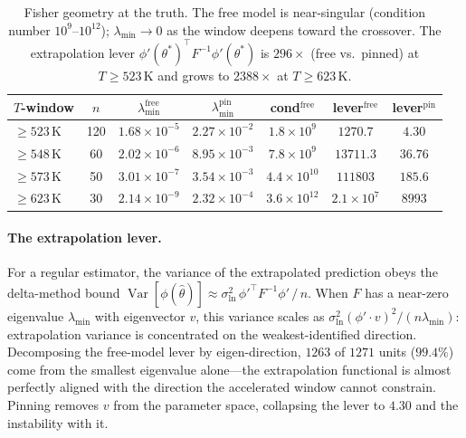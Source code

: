 \documentclass{article}
\newcommand{\sln}{\sigma_{\ln}}
\begin{document}
\begin{table}[t]
\centering\small
\begin{tabular}{lcccccc}
\toprule
$T$-window & $n$ & $\lambda_{\min}^{\mathrm{free}}$ &
$\lambda_{\min}^{\mathrm{pin}}$ & cond$^{\mathrm{free}}$ &
lever$^{\mathrm{free}}$ & lever$^{\mathrm{pin}}$ \\
\midrule
$\ge523$\,K & 120 & $1.68\times10^{-5}$ & $2.27\times10^{-2}$ &
$1.8\times10^9$ & $1270.7$ & $4.30$ \\
$\ge548$\,K & 60 & $2.02\times10^{-6}$ & $8.95\times10^{-3}$ &
$7.8\times10^9$ & $13711.3$ & $36.76$ \\
$\ge573$\,K & 50 & $3.01\times10^{-7}$ & $3.54\times10^{-3}$ &
$4.4\times10^{10}$ & $111803$ & $185.6$ \\
$\ge623$\,K & 30 & $2.14\times10^{-9}$ & $2.32\times10^{-4}$ &
$3.6\times10^{12}$ & $2.1\times10^7$ & $8993$ \\
\bottomrule
\end{tabular}
\caption{Fisher geometry at the truth. The free model is near-singular
(condition number $10^9$--$10^{12}$); $\lambda_{\min}\to0$ as the window
deepens toward the crossover. The extrapolation lever
$\phi'(\theta^*)^{\top}F^{-1}\phi'(\theta^*)$ is $296\times$ (free vs.\ pinned)
at $T\ge523$\,K and grows to $2388\times$ at $T\ge623$\,K.}
\label{tab:fisher}
\end{table}

\paragraph{The extrapolation lever.} For a regular estimator, the variance of
the extrapolated prediction obeys the delta-method bound
$\operatorname{Var}[\phi(\hat\theta)]\approx
\sln^2\,\phi'^{\top}F^{-1}\phi'\,/\,n$. When $F$ has a near-zero eigenvalue
$\lambda_{\min}$ with eigenvector $v$, this variance scales as
$\sln^2(\phi'\cdot v)^2/(n\lambda_{\min})$: extrapolation variance is
concentrated on the weakest-identified direction. Decomposing the free-model
lever by eigen-direction, $1263$ of $1271$ units ($99.4\%$) come from the
smallest eigenvalue alone---the extrapolation functional is almost perfectly
aligned with the direction the accelerated window cannot constrain. Pinning
removes $v$ from the parameter space, collapsing the lever to $4.30$ and the
instability with it.
\end{document}
